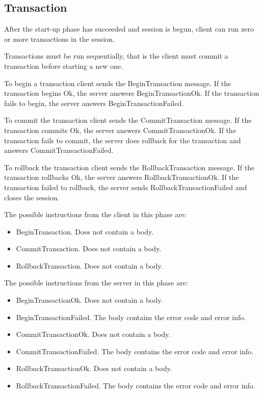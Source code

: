 \documentclass[a4paper,12pt]{article}
\begin{document}
\subsection{Transaction}

After the start-up phase has succeeded and session is begun, client can run zero or more transactions in the session.

Transactions must be run sequentially, that is the client must commit a transaction before starting a new one.

To begin a transaction client sends the BeginTransaction message. If the transaction begins Ok, the server answers BeginTransactionOk. If the transaction fails to begin, the server answers BeginTransactionFailed.

To commit the transaction client sends the CommitTransaction message. If the transaction commits Ok, the server answers CommitTransactionOk. If the transaction fails to commit, the server does rollback for the transaction and answers CommitTransactionFailed.

To rollback the transaction client sends the RollbackTransaction message. If the transaction rollbacks Ok, the server answers RollbackTransactionOk. If the transaction failed to rollback, the server sends RollbackTransactionFailed and closes the session.

The possible instructions from the client in this phase are:
\begin{itemize} 
\item BeginTransaction. Does not contain a body.
\item CommitTransaction. Does not contain a body.
\item RollbackTransaction. Does not contain a body.
\end{itemize}

The possible instructions from the server in this phase are:
\begin{itemize}
\item BeginTransactionOk. Does not contain a body.
\item BeginTransactionFailed. The body contains the error code and error info.
\item CommitTransactionOk. Does not contain a body.
\item CommitTransactionFailed. The body contains the error code and error info.
\item RollbackTransactionOk. Does not contain a body.
\item RollbackTransactionFailed. The body contains the error code and error info.
\end{itemize} 
\end{document}
